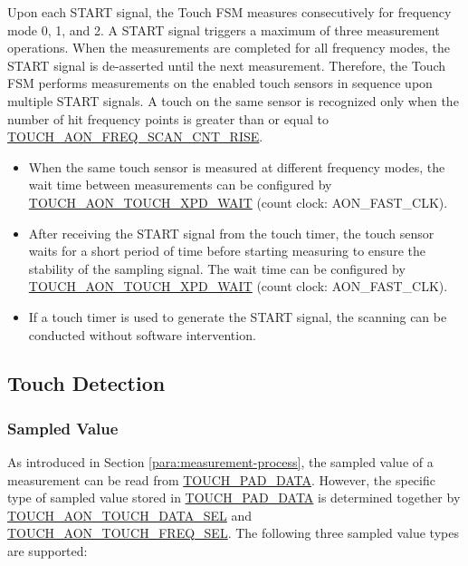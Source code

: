 \documentclass[main\_\_EN.tex]{subfiles}
\begin{document}
Upon each START signal, the Touch FSM measures consecutively for frequency mode 0, 1, and 2. A START signal triggers a maximum of three measurement operations. When the measurements are completed for all frequency modes, the START signal is de-asserted until the next measurement. Therefore, the Touch FSM performs measurements on the enabled touch sensors in sequence upon multiple START signals. A touch on the same sensor is recognized only when the number of hit frequency points is greater than or equal to \hyperref[fielddesc:TOUCHAONFREQSCANCNTRISE]{TOUCH\_AON\_FREQ\_SCAN\_CNT\_RISE}.

\begin{tiplisting}
    \vspace{-2em}
    \begin{itemize}
        \item When the same touch sensor is measured at different frequency modes, the wait time between measurements can be configured by \hyperref[fielddesc:TOUCHAONTOUCHXPDWAIT]{TOUCH\_AON\_TOUCH\_XPD\_WAIT} (count clock: AON\_FAST\_CLK).
        \item After receiving the START signal from the touch timer, the touch sensor waits for a short period of time before starting measuring to ensure the stability of the sampling signal. The wait time can be configured by \hyperref[fielddesc:TOUCHAONTOUCHXPDWAIT]{TOUCH\_AON\_TOUCH\_XPD\_WAIT} (count clock: AON\_FAST\_CLK).
        \item If a touch timer is used to generate the START signal, the scanning can be conducted without software intervention.
    \end{itemize}
\end{tiplisting}

\subsection{Touch Detection}

\subsubsection{Sampled Value}
\label{para:sampled-value}

As introduced in Section \ref{para:measurement-process}, the sampled value of a measurement can be read from \hyperref[fielddesc:TOUCHPAD0DATA]{TOUCH\_PAD\_DATA}. However, the specific type of sampled value stored in \hyperref[fielddesc:TOUCHPAD0DATA]{TOUCH\_PAD\_DATA} is determined together by \hyperref[fielddesc:TOUCHAONTOUCHDATASEL]{TOUCH\_AON\_TOUCH\_DATA\_SEL} and \hyperref[fielddesc:TOUCHAONTOUCHFREQSEL]{TOUCH\_AON\_TOUCH\_FREQ\_SEL}. The following three sampled value types are supported:
\end{document}
